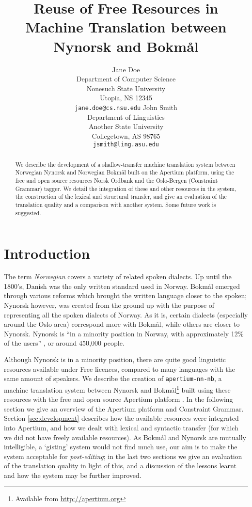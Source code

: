 \documentclass[11pt]{article}
\author{Jane Doe\\  Department of Computer Science \\  Nonesuch State University \\  Utopia, NS 12345 \\  {\tt jane.doe@cs.nsu.edu} \And  John Smith \\  Department of Linguistics \\  Another State University \\  Collegetown, AS 98765 \\    {\tt jsmith@ling.asu.edu}}
\title{Reuse of Free Resources in Machine Translation between Nynorsk and Bokmål}
\begin{document}
\maketitle

  \begin{abstract}
    We describe the development of a shallow-transfer machine
    translation system between Norwegian Nynorsk and Norwegian Bokmål
    built on the Apertium platform, using the free and open source
    resources Norsk Ordbank and the Oslo-Bergen (Constraint Grammar)
    tagger. We detail the integration of these and other resources in
    the system, the construction of the lexical and structural
    transfer, and give an evaluation of the translation quality and a
    comparison with another system. Some future work is suggested.
  \end{abstract}

\section{Introduction}

The term \emph{Norwegian} covers a variety of related spoken dialects.
Up until the 1800's, Danish was the only written standard used in
Norway. Bokmål emerged through various reforms which brought the
written language closer to the spoken; Nynorsk however, was created
from the ground up with the purpose of representing all the spoken
dialects of Norway. As it is, certain dialects (especially around the
Oslo area) correspond more with Bokmål, while others are closer to
Nynorsk. Nynorsk is ``in a minority position in Norway, with
approximately 12\% of the users'' \citep{everson2000sln}, or around
450,000 people.

Although Nynorsk is in a minority position, there are quite good
linguistic resources available under Free licences, compared to many
languages with the same amount of speakers. We describe the creation
of {\tt apertium-nn-nb}, a machine translation system between Nynorsk
and Bokmål\footnote{Available from
  \href{http://apertium.org}{http://apertium.org} } built using these
resources with the free and open source Apertium platform
\citep{corbi05oss}. In the following section we give an overview of
the Apertium platform and Constraint Grammar. Section
\ref{sec:development} describes how the available resources were
integrated into Apertium, and how we dealt with lexical and syntactic
transfer (for which we did not have freely available resources). As
Bokmål and Nynorsk are mutually intelligible, a `gisting' system would
not find much use, our aim is to make the system acceptable for
\emph{post-editing}; in the last two sections we give an evaluation of
the translation quality in light of this, and a discussion of the
lessons learnt and how the system may be further improved.
\end{document}
